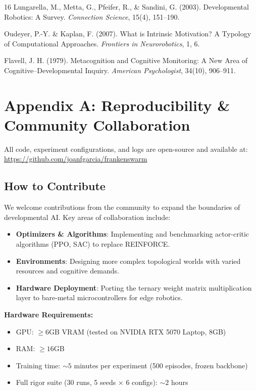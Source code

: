 \documentclass{article}
\begin{document}
\begin{thebibliography}{16}
Lungarella, M., Metta, G., Pfeifer, R., \& Sandini, G. (2003). Developmental Robotics: A Survey. \textit{Connection Science}, 15(4), 151–190.

Oudeyer, P.-Y. \& Kaplan, F. (2007). What is Intrinsic Motivation? A Typology of Computational Approaches. \textit{Frontiers in Neurorobotics}, 1, 6.

Flavell, J. H. (1979). Metacognition and Cognitive Monitoring: A New Area of Cognitive–Developmental Inquiry. \textit{American Psychologist}, 34(10), 906–911.

\end{thebibliography}

\appendix
\section{Appendix A: Reproducibility \& Community Collaboration}
All code, experiment configurations, and logs are open-source and available at: \url{https://github.com/joanfgarcia/frankenswarm}

\subsection{How to Contribute}
We welcome contributions from the community to expand the boundaries of developmental AI. Key areas of collaboration include:
\begin{itemize}
    \item \textbf{Optimizers \& Algorithms}: Implementing and benchmarking actor-critic algorithms (PPO, SAC) to replace REINFORCE.
    \item \textbf{Environments}: Designing more complex topological worlds with varied resources and cognitive demands.
    \item \textbf{Hardware Deployment}: Porting the ternary weight matrix multiplication layer to bare-metal microcontrollers for edge robotics.
\end{itemize}

\textbf{Hardware Requirements:}
\begin{itemize}
    \item GPU: $\ge 6$GB VRAM (tested on NVIDIA RTX 5070 Laptop, 8GB)
    \item RAM: $\ge 16$GB
    \item Training time: $\sim 5$ minutes per experiment (500 episodes, frozen backbone)
    \item Full rigor suite (30 runs, 5 seeds $\times$ 6 configs): $\sim 2$ hours
\end{itemize}
\end{document}
